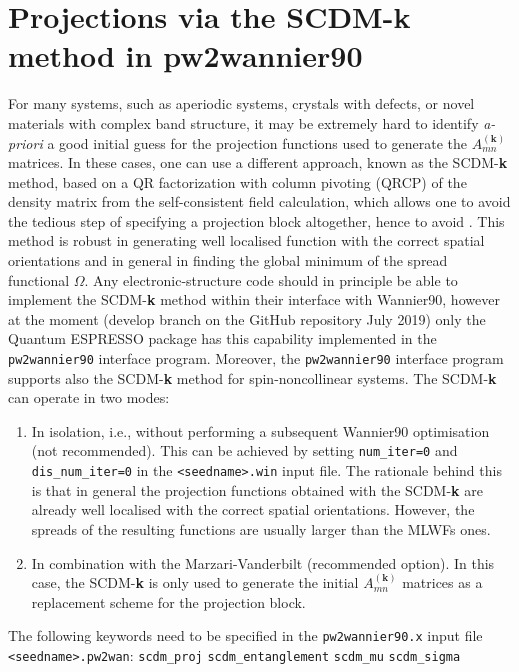 \section{Projections via the SCDM-\textbf{k} method in pw2wannier90}
For many systems, such as aperiodic systems, crystals with defects, or novel materials with complex band structure,  it may be extremely hard to identify \emph{a-priori} a good initial guess for the projection functions used to generate the $A_{mn}^{(\mathbf{k})}$ matrices. In these cases, one can use a different approach, known as the SCDM-\textbf{k} method\cite{LinLin-ArXiv2017}, based on a QR factorization with column pivoting (QRCP) of the density matrix from the self-consistent field calculation, which allows one to avoid the tedious step of specifying a projection block altogether, hence to avoid . This method is robust in generating well localised function with the correct spatial orientations and in general in finding the global minimum of the spread functional $\Omega$. Any electronic-structure code should in principle be able to implement the SCDM-\textbf{k} method within their interface with Wannier90, however at the moment (develop branch on the GitHub repository July 2019) only the Quantum ESPRESSO package has this capability implemented in the \texttt{pw2wannier90} interface program.
Moreover, the \texttt{pw2wannier90} interface program supports also the SCDM-\textbf{k} method for spin-noncollinear systems.
 The SCDM-\textbf{k} can operate in two modes:
\begin{enumerate}
\item In isolation, i.e., without performing a subsequent Wannier90 optimisation (not recommended). This can be achieved by setting {\tt num\_iter=0} and {\tt dis\_num\_iter=0} in the \verb#<seedname>.win# input file. The rationale behind this is that in general the projection functions obtained with the SCDM-\textbf{k} are already well localised with the correct spatial orientations. However, the spreads of the resulting functions are usually larger than the MLWFs ones.
\item In combination with the Marzari-Vanderbilt (recommended option). In this case, the SCDM-\textbf{k} is only used to generate the initial $A_{mn}^{(\mathbf{k})}$ matrices as a replacement scheme for the projection block.
\end{enumerate}

The following keywords need to be specified in the {\tt pw2wannier90.x} input file \verb#<seedname>.pw2wan#:
\noindent
\verb#scdm_proj#
\verb#scdm_entanglement#
\verb#scdm_mu#
\verb#scdm_sigma#
\noindent
